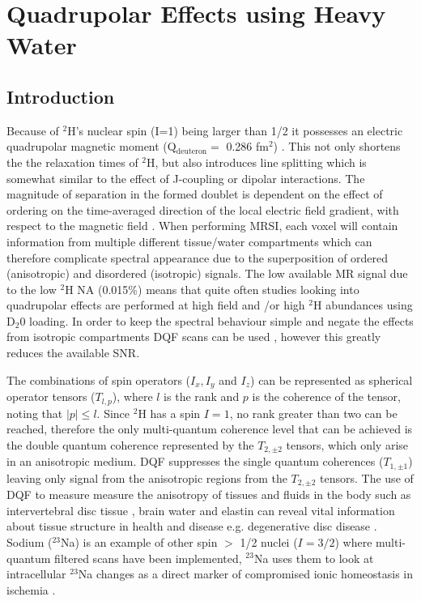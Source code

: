 \chapter{Quadrupolar Effects using Heavy Water}
\label{Chap:Quad}

\section{Introduction}

Because of $^2$H's nuclear spin (I=1) being larger than 1/2 it possesses an electric quadrupolar magnetic moment (Q$_{\text{deuteron}}=$ 0.286 fm$^2$)  \cite{Stone2015NuclearData}. This not only shortens the the relaxation times of $^2$H, but also introduces line splitting which is somewhat similar to the effect of J-coupling or dipolar interactions. The magnitude of separation in the formed doublet is dependent on the effect of ordering on the time-averaged direction of the local electric field gradient, with respect to the magnetic field \cite{Seelig1977DeuteriumMembranes, Eliav2016MultipleMRS}. When performing \ac{MRSI}, each voxel will contain information from multiple different tissue/water compartments which can therefore complicate spectral appearance due to the superposition of ordered (anisotropic) and disordered (isotropic) signals. The low available MR signal due to the low $^2$H \ac{NA} (0.015\%) means that quite often studies looking into quadrupolar effects are performed at high field  \cite{Gursan2022ResidualMuscle} and \cite{Ooms2015DoubleTissue}/or \cite{Damion2022DoubleLoading} high $^2$H abundances using D$_2$0 loading. In order to keep the spectral behaviour simple and negate the effects from isotropic compartments \ac{DQF} scans can be used \cite{Sharf1995DetectionNMR-Spectroscopy, Perea20072HDisc}, however this greatly reduces the available \ac{SNR}. 

The combinations of spin operators ($I_x, I_y$ and $I_z$) can be represented as spherical operator tensors ($T_{l,p}$), where $l$ is the rank and $p$ is the coherence of the tensor, noting that $|p| \le l$. Since $^2$H has a spin $I=1$, no rank greater than two can be reached, therefore the only multi-quantum coherence level that can be achieved is the double quantum coherence represented by the $T_{2,\pm2}$ tensors, which only arise in an anisotropic medium. \ac{DQF} suppresses the single quantum coherences ($T_{1,\pm1}$) leaving only signal from the anisotropic regions from the $T_{2,\pm2}$ tensors. The use of \ac{DQF} to measure measure the anisotropy of tissues and fluids in the body such as intervertebral disc tissue  \cite{Ooms2015DoubleTissue}, brain water \cite{Assaf1997InSpectroscopy} and elastin \cite{Sun2010InvestigationNMR} can reveal vital information about tissue structure in health and disease e.g. degenerative disc disease \cite{Ooms2015DoubleTissue}. Sodium ($^{23}$Na) is an example of other spin $>$ 1/2 nuclei ($I=3/2$) where multi-quantum filtered scans have been implemented, $^{23}$Na uses them to look at intracellular $^{23}$Na changes as a direct marker of compromised ionic homeostasis in ischemia \cite{Tsang2012Triple-quantum-filteredT}.

